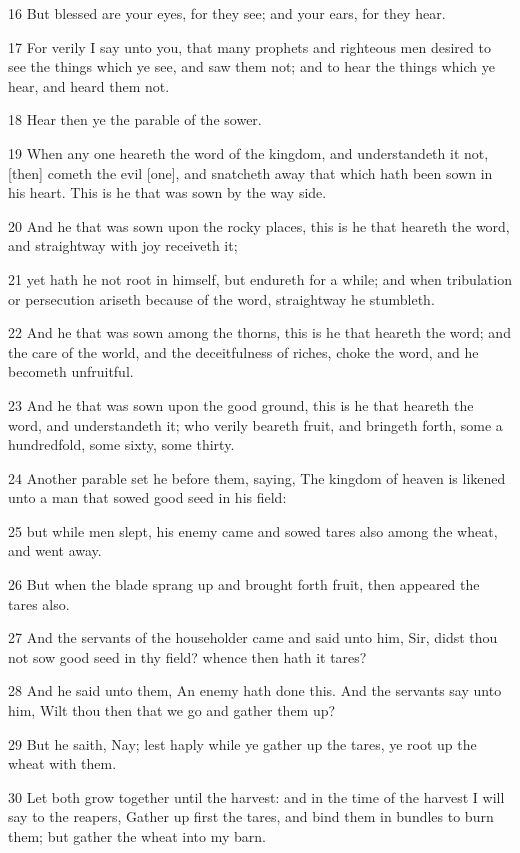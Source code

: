 \par 16 But blessed are your eyes, for they see; and your ears, for they hear.
\par 17 For verily I say unto you, that many prophets and righteous men desired to see the things which ye see, and saw them not; and to hear the things which ye hear, and heard them not.
\par 18 Hear then ye the parable of the sower.
\par 19 When any one heareth the word of the kingdom, and understandeth it not, [then] cometh the evil [one], and snatcheth away that which hath been sown in his heart. This is he that was sown by the way side.
\par 20 And he that was sown upon the rocky places, this is he that heareth the word, and straightway with joy receiveth it;
\par 21 yet hath he not root in himself, but endureth for a while; and when tribulation or persecution ariseth because of the word, straightway he stumbleth.
\par 22 And he that was sown among the thorns, this is he that heareth the word; and the care of the world, and the deceitfulness of riches, choke the word, and he becometh unfruitful.
\par 23 And he that was sown upon the good ground, this is he that heareth the word, and understandeth it; who verily beareth fruit, and bringeth forth, some a hundredfold, some sixty, some thirty.
\par 24 Another parable set he before them, saying, The kingdom of heaven is likened unto a man that sowed good seed in his field:
\par 25 but while men slept, his enemy came and sowed tares also among the wheat, and went away.
\par 26 But when the blade sprang up and brought forth fruit, then appeared the tares also.
\par 27 And the servants of the householder came and said unto him, Sir, didst thou not sow good seed in thy field? whence then hath it tares?
\par 28 And he said unto them, An enemy hath done this. And the servants say unto him, Wilt thou then that we go and gather them up?
\par 29 But he saith, Nay; lest haply while ye gather up the tares, ye root up the wheat with them.
\par 30 Let both grow together until the harvest: and in the time of the harvest I will say to the reapers, Gather up first the tares, and bind them in bundles to burn them; but gather the wheat into my barn.
